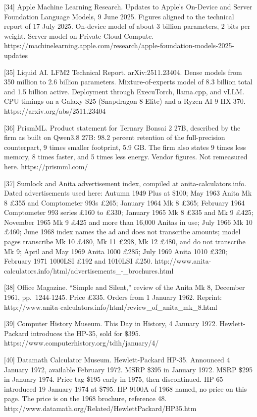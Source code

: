 \documentclass[
  10pt,
]{article}
\begin{document}
{[}34{]} Apple Machine Learning Research. Updates to Apple's On-Device
and Server Foundation Language Models, 9 June 2025. Figures aligned to
the technical report of 17 July 2025. On-device model of about 3 billion
parameters, 2 bits per weight. Server model on Private Cloud Compute.
https://machinelearning.apple.com/research/apple-foundation-models-2025-updates

{[}35{]} Liquid AI. LFM2 Technical Report. arXiv:2511.23404. Dense
models from 350 million to 2.6 billion parameters. Mixture-of-experts
model of 8.3 billion total and 1.5 billion active. Deployment through
ExecuTorch, llama.cpp, and vLLM. CPU timings on a Galaxy S25 (Snapdragon
8 Elite) and a Ryzen AI 9 HX 370. https://arxiv.org/abs/2511.23404

{[}36{]} PrismML. Product statement for Ternary Bonsai 2 27B, described
by the firm as built on Qwen3.8 27B: 98.2 percent retention of the
full-precision counterpart, 9 times smaller footprint, 5.9 GB. The firm
also states 9 times less memory, 8 times faster, and 5 times less
energy. Vendor figures. Not remeasured here. https://prismml.com/

{[}37{]} Sumlock and Anita advertisement index, compiled at
anita-calculators.info. Dated advertisements used here: Autumn 1949 Plus
at \$100; May 1963 Anita Mk 8 £355 and Comptometer 993s £265; January
1964 Mk 8 £365; February 1964 Comptometer 993 series £160 to £330;
January 1965 Mk 8 £335 and Mk 9 £425; November 1965 Mk 9 £425 and more
than 16,000 Anitas in use; July 1966 Mk 10 £460; June 1968 index names
the ad and does not transcribe amounts; model pages transcribe Mk 10
£480, Mk 11 £298, Mk 12 £480, and do not transcribe Mk 9; April and May
1969 Anita 1000 £285; July 1969 Anita 1010 £320; February 1971 1000LSI
£192 and 1010LSI £250.
http://www.anita-calculators.info/html/advertisements\_-\_brochures.html

{[}38{]} Office Magazine. ``Simple and Silent,'' review of the Anita Mk
8, December 1961, pp.~1244-1245. Price £335. Orders from 1 January 1962.
Reprint:
http://www.anita-calculators.info/html/review\_of\_anita\_mk\_8.html

{[}39{]} Computer History Museum. This Day in History, 4 January 1972.
Hewlett-Packard introduces the HP-35, sold for \$395.
https://www.computerhistory.org/tdih/january/4/

{[}40{]} Datamath Calculator Museum. Hewlett-Packard HP-35. Announced 4
January 1972, available February 1972. MSRP \$395 in January 1972. MSRP
\$295 in January 1974. Price tag \$195 early in 1975, then discontinued.
HP-65 introduced 19 January 1974 at \$795. HP 9100A of 1968 named, no
price on this page. The price is on the 1968 brochure, reference 48.
http://www.datamath.org/Related/HewlettPackard/HP35.htm
\end{document}
